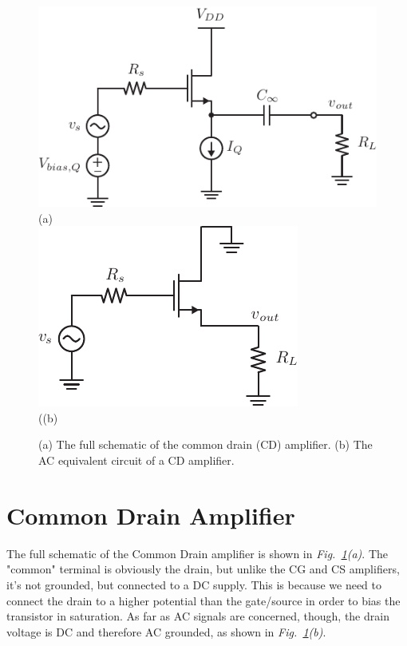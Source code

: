 \begin{figure}[H]
\centering
\includegraphics[scale=.9]{cd_amp_dc}\\
(a)\\[0.15cm]
\includegraphics[scale=.9]{cd_amp_ac}\\
((b)\\
\caption{(a) The full schematic of the common drain (CD) amplifier.  (b) The AC equivalent circuit of a CD amplifier.}
\label{fig:cd_amp_dc_ac}
\end{figure}
\newpage
\section{Common Drain Amplifier}
The full schematic of the Common Drain amplifier is shown in \emph{Fig.~\ref{fig:cd_amp_dc_ac}(a)}.  The "common" terminal is obviously the drain, but unlike the CG and CS amplifiers, it's not grounded, but connected to a DC supply.  This is because we need to connect the drain to a higher potential than the gate/source in order to bias the transistor in saturation.  As far as AC signals are concerned, though, the drain voltage is DC and therefore AC grounded, as shown in \emph{Fig.~\ref{fig:cd_amp_dc_ac}(b)}.
